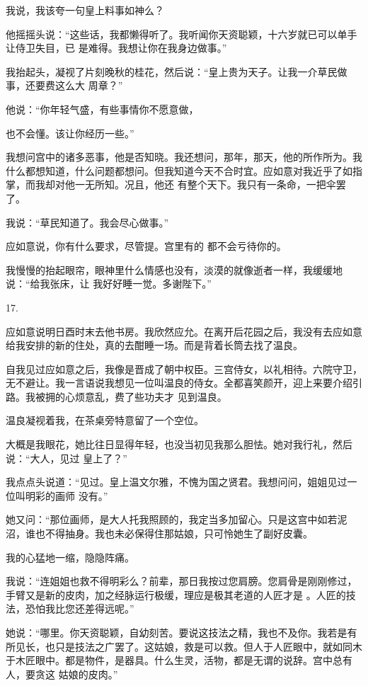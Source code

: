 \documentclass{article}
\begin{document}
我说，我该夸一句皇上料事如神么？ 

他摇摇头说：“这些话，我都懒得听了。我听闻你天资聪颖，十六岁就已可以单手让侍卫失目，已
是难得。我想让你在我身边做事。” 

我抬起头，凝视了片刻晚秋的桂花，然后说：“皇上贵为天子。让我一介草民做事，还要费这么大
周章？” 

他说：“你年轻气盛，有些事情你不愿意做，

\newpage
也不会懂。该让你经历一些。” 

我想问宫中的诸多恶事，他是否知晓。我还想问，那年，那天，他的所作所为。我什么都想知道，什么问题都想问。但我知道今天不合时宜。应如意对我近乎了如指掌，而我却对他一无所知。况且，他还
有整个天下。我只有一条命，一把伞罢了。 


我说：“草民知道了。我会尽心做事。” 

应如意说，你有什么要求，尽管提。宫里有的
都不会亏待你的。 

我慢慢的抬起眼帘，眼神里什么情感也没有，淡漠的就像逝者一样，我缓缓地说：“给我张床，让
我好好睡一觉。多谢陛下。” 


17. 

应如意说明日酉时末去他书房。我欣然应允。在离开后花园之后，我没有去应如意给我安排的新的住处，真的去酣睡一场。而是背着长筒去找了温良。
\newpage


自我见过应如意之后，我像是晋成了朝中权臣。三宫侍女，以礼相待。六院守卫，无不避让。我一言语说我想见一位叫温良的侍女。全都喜笑颜开，迎上来要介绍引路。我被拥的心烦意乱，费了些功夫才
见到温良。 

温良凝视着我，在茶桌旁特意留了一个空位。

大概是我眼花，她比往日显得年轻，也没当初见我那么胆怯。她对我行礼，然后说：“大人，见过
皇上了？” 

我点点头说道：“见过。皇上温文尔雅，不愧为国之贤君。我想问问，姐姐见过一位叫明彩的画师
没有。” 

她又问：“那位画师，是大人托我照顾的，我定当多加留心。只是这宫中如若泥沼，谁也不得抽身。我也未必保得住那姑娘，只可怜她生了副好皮囊。

\newpage


我的心猛地一缩，隐隐阵痛。 

我说：“连姐姐也救不得明彩么？前辈，那日我按过您肩膀。您肩骨是刚刚修过，手臂又是新的皮肉，加之经脉运行极缓，理应是极其老道的人匠才是
。人匠的技法，恐怕我比您还差得远呢。” 

她说：“哪里。你天资聪颖，自幼刻苦。要说这技法之精，我也不及你。我若是有所见长，也只是技法之广罢了。这姑娘，救是可以救。但人于人匠眼中，就如同木于木匠眼中。都是物件，是器具。什么生灵，活物，都是无谓的说辞。宫中总有人，要贪这
姑娘的皮肉。” 
\end{document}
